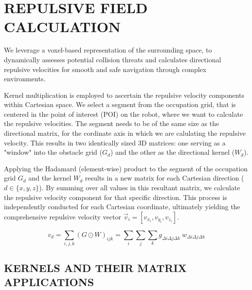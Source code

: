 \documentclass[letterpaper, 10 pt, conference]{ieeeconf}  %
\begin{document}
\section{REPULSIVE FIELD CALCULATION}
\label{section:repulsive_vel}

We leverage a voxel-based representation of the surrounding space, to dynamically assesses potential collision threats and calculates directional repulsive velocities for smooth and safe navigation through complex environments. 

Kernel multiplication is employed to ascertain the repulsive velocity components within Cartesian space. We select a segment from the occupation grid, that is centered in the point of interest (POI) on the robot, where we want to calculate the repulsive velocities. The segment needs to be of the same size as the directional matrix, for the cordinate axis in which we are calulating the repulsive velocity. This results in two identically sized 3D matrices: one serving as a "window" into the obstacle grid (\(G_d\)) and the other as the directional kernel (\(W_d\)).

Applying the Hadamard (element-wise) product to the segment of the occupation grid \(G_d\) and the kernel \(W_d\) results in a new matrix for each Cartesian direction (\(d \in \{x, y, z\}\)). By summing over all values in this resultant matrix, we calculate the repulsive velocity component for that specific direction. This process is independently conducted for each Cartesian coordinate, ultimately yielding the comprehensive repulsive velocity vector \(\vec{v}_i = [ v_{x_i}, v_{y_i}, v_{z_i}]\).

\begin{equation}
	v_d = \sum_{i,j,k} (G \odot W)_{ijk} = \sum_{i}\sum_{j}\sum_{k} g_{\Delta i \Delta j \Delta k} ~  w_{\Delta i \Delta j \Delta k}
	\label{eq:matrix-product}
\end{equation}


\subsection{KERNELS AND THEIR MATRIX APPLICATIONS}
\end{document}
